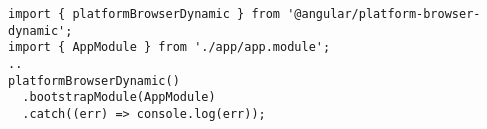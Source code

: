 \begin{verbatim}
import { platformBrowserDynamic } from '@angular/platform-browser-dynamic';
import { AppModule } from './app/app.module';
..
platformBrowserDynamic()
  .bootstrapModule(AppModule)
  .catch((err) => console.log(err));
\end{verbatim}
